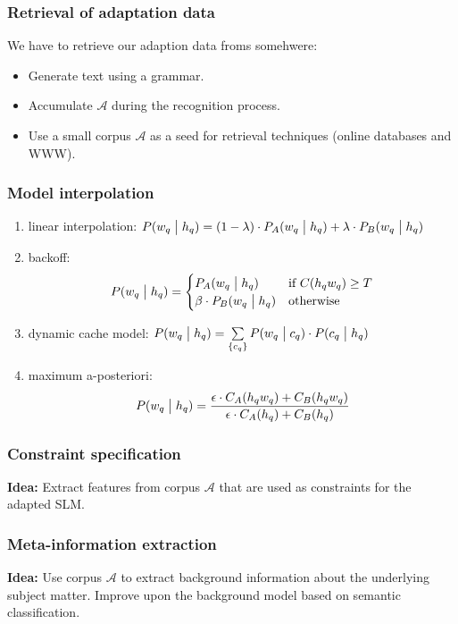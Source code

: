 \documentclass[11pt]{article}
\begin{document}
\subsubsection{Retrieval of adaptation data}
We have to retrieve our adaption data froms somehwere:
\begin{itemize}
    \item Generate text using a grammar.
    \item Accumulate $\mathcal{A}$ during the recognition process.
    \item Use a small corpus $\mathcal{A}$ as a seed for retrieval techniques (online databases and WWW).
\end{itemize}

\subsubsection{Model interpolation}
\begin{enumerate}
    \item linear interpolation: $P(w_q \bigm| h_q) = (1 - \lambda) \cdot P_A(w_q \bigm| h_q) + \lambda \cdot P_B(w_q \bigm| h_q)$
    \item backoff:
        \[
            P(w_q \bigm| h_q) = \begin{cases}
                P_A(w_q \bigm| h_q) & \mbox{if } C(h_q w_q) \geq T \\
                \beta \cdot P_B(w_q \bigm| h_q) & \mbox{otherwise}
            \end{cases}
        \]
    \item dynamic cache model: $P(w_q \bigm| h_q) = \sum\limits_{\left\{c_q\right\}} P(w_q \bigm| c_q) \cdot P(c_q \bigm| h_q)$
    \item maximum a-posteriori:
        \[
            P(w_q \bigm| h_q) = \frac{\epsilon \cdot C_A(h_qw_q) + C_B(h_qw_q)}{\epsilon \cdot C_A(h_q) + C_B(h_q)}
        \]
\end{enumerate}

\subsubsection{Constraint specification}
\textbf{Idea:} Extract features from corpus $\mathcal{A}$ that are used as constraints for the adapted SLM.
\subsubsection{Meta-information extraction}
\textbf{Idea:} Use corpus $\mathcal{A}$ to extract background information about the underlying subject matter. Improve upon the background model based on semantic classification.
\end{document}

